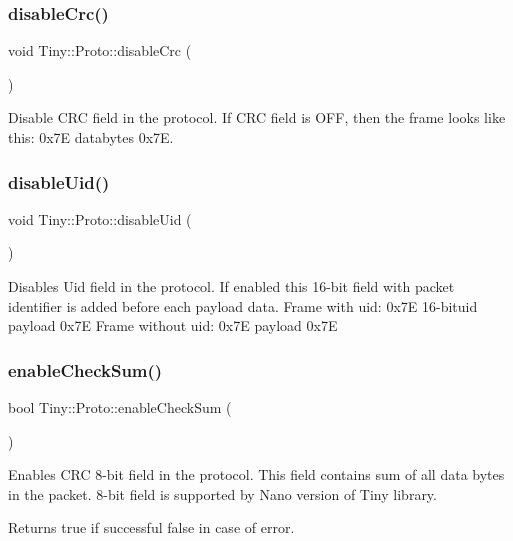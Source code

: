 \subsubsection{\texorpdfstring{disable\+Crc()}{disableCrc()}}
{\footnotesize\ttfamily void Tiny\+::\+Proto\+::disable\+Crc (\begin{DoxyParamCaption}{ }\end{DoxyParamCaption})}

Disable C\+RC field in the protocol. If C\+RC field is O\+FF, then the frame looks like this\+: 0x7E databytes 0x7E. \mbox{\label{classTiny_1_1Proto_aff9f3c59f58a8ca527ad0254ab806c5c}} 
\subsubsection{\texorpdfstring{disable\+Uid()}{disableUid()}}
{\footnotesize\ttfamily void Tiny\+::\+Proto\+::disable\+Uid (\begin{DoxyParamCaption}{ }\end{DoxyParamCaption})\hspace{0.3cm}{\ttfamily [inline]}}

Disables Uid field in the protocol. If enabled this 16-\/bit field with packet identifier is added before each payload data. Frame with uid\+: 0x7E 16-\/bituid payload 0x7E Frame without uid\+: 0x7E payload 0x7E \mbox{\label{classTiny_1_1Proto_abb6cbae9a9944dc9ae0d756554f65a52}} 
\subsubsection{\texorpdfstring{enable\+Check\+Sum()}{enableCheckSum()}}
{\footnotesize\ttfamily bool Tiny\+::\+Proto\+::enable\+Check\+Sum (\begin{DoxyParamCaption}{ }\end{DoxyParamCaption})}

Enables C\+RC 8-\/bit field in the protocol. This field contains sum of all data bytes in the packet. 8-\/bit field is supported by Nano version of Tiny library. \begin{DoxyReturn}{Returns}
true if successful false in case of error. 
\end{DoxyReturn}
\mbox{\label{classTiny_1_1Proto_a794afcac2ca15544247c34b059bc1289}} 
